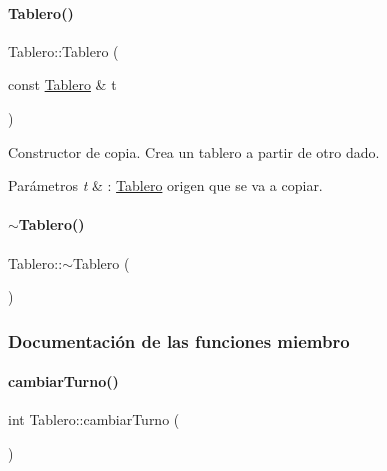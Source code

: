 \paragraph{\texorpdfstring{Tablero()}{Tablero()}\hspace{0.1cm}{\footnotesize\ttfamily [3/3]}}
{\footnotesize\ttfamily Tablero\+::\+Tablero (\begin{DoxyParamCaption}\item[{const \hyperlink{classTablero}{Tablero} \&}]{t }\end{DoxyParamCaption})}



Constructor de copia. Crea un tablero a partir de otro dado. 


\begin{DoxyParams}{Parámetros}
{\em t} & \+: \hyperlink{classTablero}{Tablero} origen que se va a copiar. \\
\hline
\end{DoxyParams}
\hypertarget{classTablero_a7d4a64967ce0bbe2cce49ec846834c84}{}\label{classTablero_a7d4a64967ce0bbe2cce49ec846834c84} 
\paragraph{\texorpdfstring{$\sim$\+Tablero()}{~Tablero()}}
{\footnotesize\ttfamily Tablero\+::$\sim$\+Tablero (\begin{DoxyParamCaption}{ }\end{DoxyParamCaption})}



\subsubsection{Documentación de las funciones miembro}
\hypertarget{classTablero_a6a07659599bca3442cce101d7bf42b9a}{}\label{classTablero_a6a07659599bca3442cce101d7bf42b9a} 
\paragraph{\texorpdfstring{cambiar\+Turno()}{cambiarTurno()}}
{\footnotesize\ttfamily int Tablero\+::cambiar\+Turno (\begin{DoxyParamCaption}{ }\end{DoxyParamCaption})}



